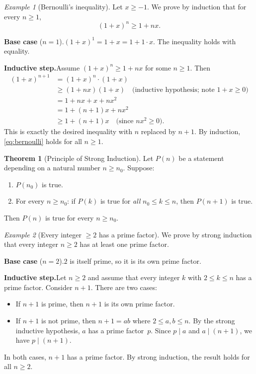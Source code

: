 \documentclass[12pt,a4paper,openany]{book}
\theoremstyle{definition}
\newtheorem{theorem}{Theorem}[chapter]
\theoremstyle{remark}
\newtheorem{example}{Example}[chapter]
\begin{document}
\begin{example}[Bernoulli's inequality]\label{ex:bernoulli}
Let $x \geq -1$.  We prove by induction that for every $n \geq 1$,
\begin{equation}\label{eq:bernoulli}
  (1+x)^n \geq 1 + nx.
\end{equation}

\textbf{Base case} ($n=1$).\quad $(1+x)^1 = 1+x = 1+1\cdot x$.  The
inequality holds with equality.

\textbf{Inductive step.}\quad Assume $(1+x)^n \geq 1+nx$ for some $n\geq1$.
Then
\begin{align*}
  (1+x)^{n+1}
    &= (1+x)^n \cdot (1+x) \\
    &\geq (1+nx)(1+x) \quad\text{(inductive hypothesis; note $1+x \geq 0$)} \\
    &= 1 + nx + x + nx^2 \\
    &= 1 + (n+1)x + nx^2 \\
    &\geq 1 + (n+1)x \quad\text{(since $nx^2 \geq 0$)}.
\end{align*}
This is exactly the desired inequality with $n$ replaced by $n+1$.  By
induction, \eqref{eq:bernoulli} holds for all $n \geq 1$.
\end{example}

\begin{theorem}[Principle of Strong Induction]\label{thm:strong-induction}
Let $P(n)$ be a statement depending on a natural number $n \geq n_0$.
Suppose:
\begin{enumerate}[label=(\roman*)]
  \item $P(n_0)$ is true.
  \item For every $n \geq n_0$: if $P(k)$ is true for \emph{all}
    $n_0 \leq k \leq n$, then $P(n+1)$ is true.
\end{enumerate}
Then $P(n)$ is true for every $n \geq n_0$.
\end{theorem}

\begin{example}[Every integer $\geq 2$ has a prime factor]
\label{ex:strong-ind-prime}
We prove by strong induction that every integer $n \geq 2$ has at least one
prime factor.

\textbf{Base case} ($n=2$).\quad $2$ is itself prime, so it is its own prime
factor.

\textbf{Inductive step.}\quad Let $n \geq 2$ and assume that every integer
$k$ with $2 \leq k \leq n$ has a prime factor.  Consider $n+1$.  There are
two cases:
\begin{itemize}
  \item If $n+1$ is prime, then $n+1$ is its own prime factor.
  \item If $n+1$ is not prime, then $n+1 = ab$ where $2 \leq a,b \leq n$.
    By the strong inductive hypothesis, $a$ has a prime factor~$p$.  Since
    $p \mid a$ and $a \mid (n+1)$, we have $p \mid (n+1)$.
\end{itemize}
In both cases, $n+1$ has a prime factor.  By strong induction, the result
holds for all $n \geq 2$.
\end{example}
\end{document}
